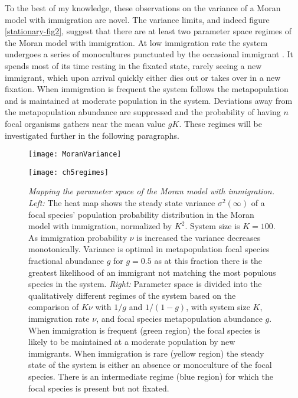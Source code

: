 To the best of my knowledge, these observations on the variance of a Moran model with immigration are novel. 
The variance limits, and indeed figure \ref{stationary-fig2}, suggest that there are at least two parameter space regimes of the Moran model with immigration. 
At low immigration rate the system undergoes a series of monocultures punctuated by the occasional immigrant \cite{Desai2007}. 
It spends most of its time resting in the fixated state, rarely seeing a new immigrant, which upon arrival quickly either dies out or takes over in a new fixation. 
When immigration is frequent the system follows the metapopulation and is maintained at moderate population in the system. 
Deviations away from the metapopulation abundance are suppressed and the probability of having $n$ focal organisms gathers near the mean value $g K$. 
%
These regimes will be investigated further in the following paragraphs. 

\begin{figure}[h]
	\centering
	\begin{minipage}{0.49\linewidth}
		\centering
		\texttt{[image: MoranVariance]}
	\end{minipage}
	\begin{minipage}{0.49\linewidth}
		\centering
		\texttt{[image: ch5regimes]}
	\end{minipage}
	\caption{\emph{Mapping the parameter space of the Moran model with immigration.}
		\emph{Left:} The heat map shows the steady state variance $\sigma^2(\infty)$ of a focal species' population probability distribution in the Moran model with immigration, normalized by $K^2$. System size is $K=100$. As immigration probability $\nu$ is increased the variance decreases monotonically. Variance is optimal in metapopulation focal species fractional abundance $g$ for $g=0.5$ as at this fraction there is the greatest likelihood of an immigrant not matching the most populous species in the system. 
		\emph{Right:} Parameter space is divided into the qualitatively different regimes of the system based on the comparison of $K\nu$ with $1/g$ and $1/(1-g)$, with system size $K$, immigration rate $\nu$, and focal species metapopulation abundance $g$. When immigration is frequent (green region) the focal species is likely to be maintained at a moderate population by new immigrants. When immigration is rare (yellow region) the steady state of the system is either an absence or monoculture of the focal species. There is an intermediate regime (blue region) for which the focal species is present but not fixated. 
	} \label{biodiversity-regimes}
\end{figure}

